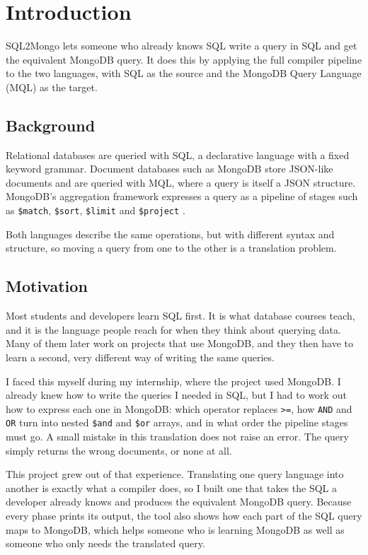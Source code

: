 \documentclass[12pt,a4paper]{report}
\newcommand{\codeus}{\textunderscore\allowbreak}
\DeclareRobustCommand{\code}[1]{\texttt{\let\_\codeus #1}}
\begin{document}
\chapter{Introduction}
SQL2Mongo lets someone who already knows SQL write a query in SQL and get the equivalent MongoDB query. It does this by applying the full compiler pipeline to the two languages, with SQL as the source and the MongoDB Query Language (MQL) as the target.

\section{Background}
Relational databases are queried with SQL, a declarative language with a fixed keyword grammar. Document databases such as MongoDB store JSON-like documents and are queried with MQL, where a query is itself a JSON structure. MongoDB's aggregation framework expresses a query as a pipeline of stages such as \code{\$match}, \code{\$sort}, \code{\$limit} and \code{\$project} \cite{mongo-pipeline}.

Both languages describe the same operations, but with different syntax and structure, so moving a query from one to the other is a translation problem.

\section{Motivation}
Most students and developers learn SQL first. It is what database courses teach, and it is the language people reach for when they think about querying data. Many of them later work on projects that use MongoDB, and they then have to learn a second, very different way of writing the same queries.

I faced this myself during my internship, where the project used MongoDB. I already knew how to write the queries I needed in SQL, but I had to work out how to express each one in MongoDB: which operator replaces \code{>=}, how \code{AND} and \code{OR} turn into nested \code{\$and} and \code{\$or} arrays, and in what order the pipeline stages must go. A small mistake in this translation does not raise an error. The query simply returns the wrong documents, or none at all.

This project grew out of that experience. Translating one query language into another is exactly what a compiler does, so I built one that takes the SQL a developer already knows and produces the equivalent MongoDB query. Because every phase prints its output, the tool also shows how each part of the SQL query maps to MongoDB, which helps someone who is learning MongoDB as well as someone who only needs the translated query.
\end{document}

